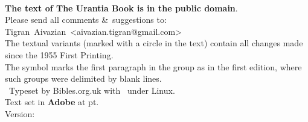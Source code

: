 \begin{center}
\\
\parbox{0.9\linewidth}{\centering
\textbf{The text of The Urantia Book is in the public domain}.\\[5pt]
Please send all comments \&\ suggestions to: {\makeatletter Tigran~Aivazian~<aivazian.tigran@gmail.com>\makeatother}\\[1pt]
The textual variants (marked with a circle in the text) contain all changes made since the 1955 First Printing.\\
The symbol \pc{} marks the first paragraph in the group as in the first edition, where such groups were delimited by blank lines.\\
\tux\ Typeset by Bibles.org.uk with \XeLaTeX\ under Linux.\\
Text set in \textbf{Adobe \urantiamainfont} at \urantiamainfontsize pt.\\[18pt]
\upshape\normalsize{} Version: \mytoday{}\\
}
\end{center}

\titleframe
